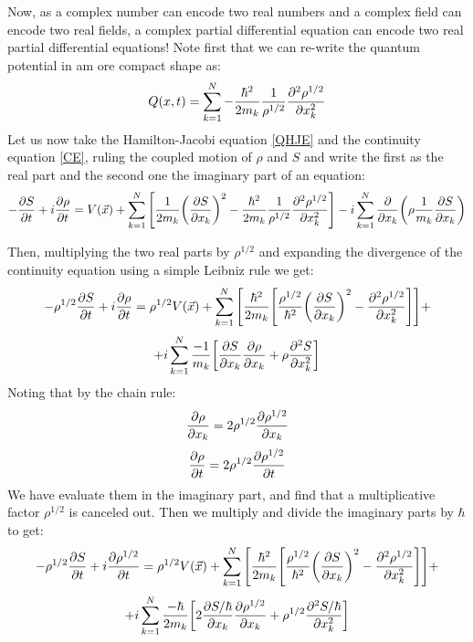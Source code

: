\documentclass[11pt, a4paper]{article} %
\DeclareRobustCommand{\mybox}[2][gray!10]{%
\begin{tcolorbox}[   %
        left=0.2cm,
        right=0.2cm,
        top=0.15cm,
        bottom=0.15cm,
        colback=#1,
        colframe=#1,
        width=\dimexpr\textwidth\relax, 
        enlarge left by=0mm,
        boxsep=5pt,
        arc=0pt,outer arc=0pt,
        ]
        #2
\end{tcolorbox}
}
\begin{document}
Now, as a complex number can encode two real numbers and a complex field can encode two real fields, a complex partial differential equation can encode two real partial differential equations! 
Note first that we can re-write the quantum potential in am ore compact shape as:
\begin{equation}
Q(x,t)=\sum_{k=1}^N-
\frac{\hbar^2}{2m_k}\frac{1}{\rho^{1/2}}\pdv[2]{\rho^{1/2}}{x_k}
\end{equation}
Let us now take the Hamilton-Jacobi equation \eqref{QHJE} and the continuity equation \eqref{CE}, ruling the coupled motion of $\rho$ and $S$ and write the first as the real part and the second one the imaginary part of an equation:
\begin{equation}
-\pdv{S}{t} + i \pdv{\rho}{t} = V(\vec{x})+\sum_{k=1}^N\qty[ \frac{1}{2m_k}\qty(\pdv{S}{x_k})^2-\frac{\hbar^2}{2m_k}\frac{1}{\rho^{1/2}}\pdv[2]{\rho^{1/2}}{x_k}]-i\sum_{k=1}^N\pdv{}{x_k}\qty(\rho\frac{1}{m_k}\pdv{S}{x_k})
\end{equation}
\mybox{
Then, multiplying the two real parts by $\rho^{1/2}$ and expanding the divergence of the continuity equation using a simple Leibniz rule we get:
\begin{equation}
-\rho^{1/2}\pdv{S}{t} + i \pdv{\rho}{t} = \rho^{1/2}V(\vec{x})+\sum_{k=1}^N\qty[ \frac{\hbar^2}{2m_k}\qty[\frac{\rho^{1/2}}{\hbar^2}\qty(\pdv{S}{x_k})^2-\pdv[2]{\rho^{1/2}}{x_k}]]+
\end{equation}
$$
+i\sum_{k=1}^N\frac{-1}{m_k}\qty[\pdv{S}{x_k}\pdv{\rho}{x_k}+\rho\pdv[2]{S}{x_k}]
$$
Noting that by the chain rule:
\begin{equation}
\pdv{\rho}{x_k}=2\rho^{1/2}\pdv{\rho^{1/2}}{x_k}
\end{equation}
\begin{equation}
\pdv{\rho}{t}=2\rho^{1/2}\pdv{\rho^{1/2}}{t}
\end{equation}
We have evaluate them in the imaginary part, and find that a multiplicative factor $\rho^{1/2}$ is canceled out. Then we multiply and divide the imaginary parts by $\hbar$ to get:
\begin{equation}
-\rho^{1/2}\pdv{S}{t} + i \pdv{\rho^{1/2}}{t} = \rho^{1/2}V(\vec{x})+\sum_{k=1}^N\qty[ \frac{\hbar^2}{2m_k}\qty[\frac{\rho^{1/2}}{\hbar^2}\qty(\pdv{S}{x_k})^2-\pdv[2]{\rho^{1/2}}{x_k}]]+
\end{equation}
$$
+i\sum_{k=1}^N\frac{-\hbar}{2m_k}\qty[2\pdv{S/\hbar}{x_k}\pdv{\rho^{1/2}}{x_k}+\rho^{1/2}\pdv[2]{S/\hbar}{x_k}]
$$
}
\end{document}

